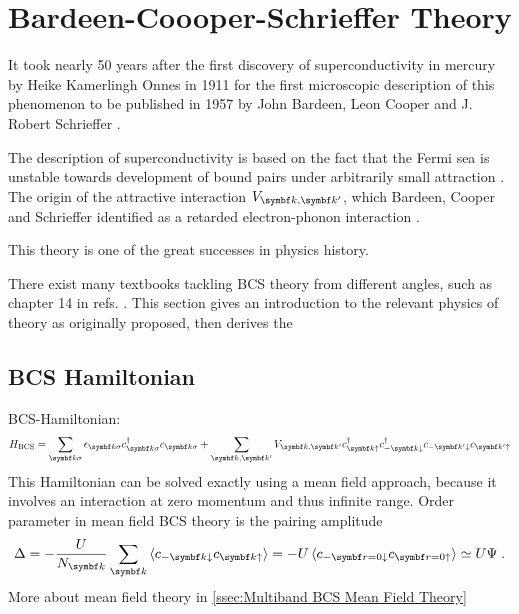 \documentclass[../notes.tex]{subfiles}
\begin{document}



\section{Bardeen-Coooper-Schrieffer Theory}\label{sec:bcs-theory}

It took nearly 50 years after the first discovery of superconductivity in mercury by Heike Kamerlingh Onnes in 1911 \cite{onnesFurtherExperimentsLiquid1991} for the first microscopic description of this phenomenon to be published in 1957 by John Bardeen, Leon Cooper and J. Robert Schrieffer \cite{bardeenTheorySuperconductivity1957}.

The  description of superconductivity is based on the fact that the Fermi sea is unstable towards development of bound pairs under arbitrarily small attraction \cite{cooperBoundElectronPairs1956}.
The origin of the attractive interaction \(V_{{\vb{k}, \vb{k}^{\prime}}}\), which Bardeen, Cooper and Schrieffer identified as a retarded electron-phonon interaction \cite{bardeenTheorySuperconductivity1957}.

This  theory is one of the great successes in physics history.

There exist many textbooks tackling BCS theory from different angles, such as chapter 14 in refs. \cite{colemanIntroductionManyBodyPhysics2015, tinkhamIntroductionSuperconductivity1996}.
This section gives an introduction to the relevant physics of  theory as originally proposed, then derives the 


\subsection{BCS Hamiltonian}


BCS-Hamiltonian:
\begin{equation}\label{eq:BCS Hamiltonian}
	H_{\text{BCS}} = \sum_{\vb{k}\sigma} \epsilon_{\vb{k}\sigma} c_{\vb{k}\sigma}^{\dagger} c_{\vb{k}\sigma} + \sum_{\vb{k}, \vb{k}^{\prime}} V_{\vb{k}, \vb{k}^{\prime}} c_{\vb{k}\uparrow}^{\dagger} c_{-\vb{k}\downarrow}^{\dagger} c_{-\vb{k}^{\prime}\downarrow} c_{\vb{k}^{\prime}\uparrow}
\end{equation}
This Hamiltonian can be solved exactly using a mean field approach, because it involves an interaction at zero momentum and thus infinite range.
Order parameter in mean field BCS theory is the pairing amplitude
\begin{equation}
	\Delta = - \frac{U}{N_{\vb{k}}} \sum_{\vb{k}} \braket{c_{-\vb{k} \downarrow} c_{\vb{k} \uparrow}} = - U \braket{c_{-\vb{r}=0 \downarrow} c_{\vb{r=0} \uparrow}} \simeq U \Psi \;.
\end{equation}
More about mean field theory in \cref{ssec:Multiband BCS Mean Field Theory}
\end{document}
